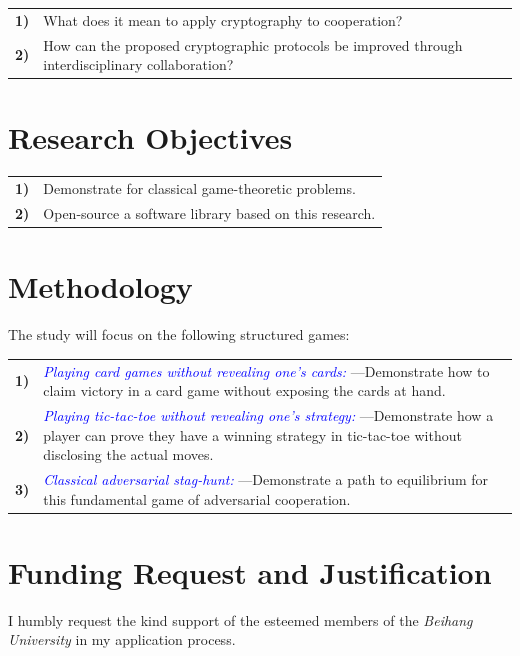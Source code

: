 \documentclass[conference]{IEEEtran}
\begin{document}
\begin{tabular}{lp{210pt}}
    {\small \textbf{1)}} & {\small What does it mean to apply cryptography to cooperation?} \\
    {\small \textbf{2)}} & {\small How can the proposed cryptographic protocols be improved through interdisciplinary collaboration?}
\end{tabular}
    
\vspace{5pt}
\section{Research Objectives}

\begin{tabular}{lp{210pt}}
    {\small \textbf{1)}} & {\small Demonstrate for classical game-theoretic problems.} \\
    {\small \textbf{2)}} & {\small Open-source a software library based on this research.} 
\end{tabular}

\section{Methodology}
\vspace{5pt}
The study will focus on the following structured games:
\vspace{5pt}

\begin{tabular}{lp{210pt}}
    {\small \textbf{1)}} & {\textcolor{blue}{\textit{Playing card games without revealing one's cards:}} \linebreak---Demonstrate how to claim victory in a card game without exposing the cards at hand. } \\
    {\small \textbf{2)}} & {\textcolor{blue}{\textit{Playing tic-tac-toe without revealing one's strategy:}} \linebreak---Demonstrate how a player can prove they have a winning strategy in tic-tac-toe without disclosing the actual moves. } \\
    {\small \textbf{3)}} & {\textcolor{blue}{\textit{Classical adversarial stag-hunt:}} ---Demonstrate a path to equilibrium for this fundamental game of adversarial cooperation. } 
\end{tabular}

\section{Funding Request and Justification}
I humbly request the kind support of the esteemed members of the \textit{Beihang University} in my application process. 
\end{document}
